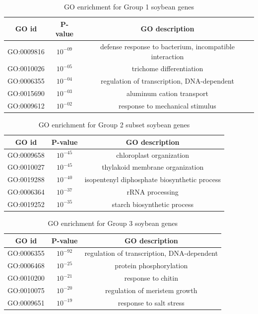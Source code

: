 \documentclass{article}
\begin{document}
		\begin{table}[h!]
			\centering
			\begin{tabular}{|c |c |c |} 
				\hline
				GO id & P-value & GO description \\
				\hline\hline
				GO:0009816 & $10^{-09}$ & defense response to bacterium, incompatible interaction \\ 
				\hline
				GO:0010026 & $10^{-05}$ & trichome differentiation \\
				\hline
				GO:0006355 & $10^{-04}$ & regulation of transcription, DNA-dependent \\
				\hline
				GO:0015690 & $10^{-03}$ & aluminum cation transport \\
				\hline
				GO:0009612 & $10^{-02}$ & response to mechanical stimulus \\ 
				\hline
			\end{tabular}
			\caption{GO enrichment for Group 1 soybean genes}
			\label{tab:gotable_group1}
		\end{table}
		
		\begin{table}[h!]
			\centering
			\begin{tabular}{|c |c |c |} 
				\hline
				GO id & P-value & GO description \\
				\hline\hline
				GO:0009658 & $10^{-45}$ & chloroplast organization \\ 
				\hline
				GO:0010027 & $10^{-45}$ & thylakoid membrane organization \\
				\hline
				GO:0019288 & $10^{-40}$ & isopentenyl diphosphate biosynthetic process \\
				\hline
				GO:0006364 & $10^{-37}$ & rRNA processing \\
				\hline
				GO:0019252 & $10^{-35}$ & starch biosynthetic process \\ 
				\hline
			\end{tabular}
			\caption{GO enrichment for Group 2 subset soybean genes}
			\label{tab:gotable_group2_subset}
		\end{table}
		
		\begin{table}[h!]
			\centering
			\begin{tabular}{|c |c |c |} 
				\hline
				GO id & P-value & GO description \\
				\hline\hline
				GO:0006355 & $10^{-92}$ & regulation of transcription, DNA-dependent \\ 
				\hline
				GO:0006468 & $10^{-25}$ & protein phosphorylation \\
				\hline
				GO:0010200 & $10^{-21}$ & response to chitin \\
				\hline
				GO:0010075 & $10^{-20}$ & regulation of meristem growth \\
				\hline
				GO:0009651 & $10^{-19}$ & response to salt stress \\ 
				\hline
			\end{tabular}
			\caption{GO enrichment for Group 3 soybean genes}
			\label{tab:gotable_group3}
		\end{table}
		
\end{document}
